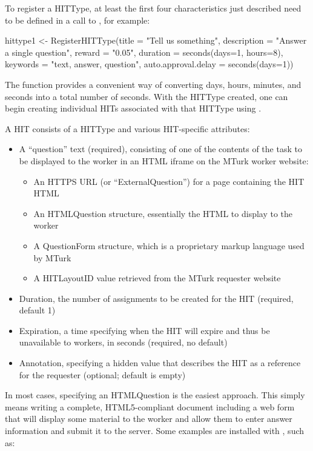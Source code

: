 To register a HITType, at least the first four characteristics just described need to be defined in a call to , for example:

\begin{example}
hittype1 <- RegisterHITType(title = "Tell us something", 
                            description = "Answer a single question", 
                            reward = "0.05", 
                            duration = seconds(days=1, hours=8), 
                            keywords = "text, answer, question", 
                            auto.approval.delay = seconds(days=1))
\end{example}

The  function provides a convenient way of converting days, hours, minutes, and seconds into a total number of seconds. With the HITType created, one can begin creating individual HITs associated with that HITType using .

A HIT consists of a HITType and various HIT-specific attributes:

\begin{itemize}
\item A ``question'' text (required), consisting of one of the contents of the task to be displayed to the worker in an HTML iframe on the MTurk worker website:
	\begin{itemize}
		\item An HTTPS URL (or ``ExternalQuestion'') for a page containing the HIT HTML
		\item An HTMLQuestion structure, essentially the HTML to display to the worker
		\item A QuestionForm structure, which is a proprietary markup language used by MTurk
		\item A HITLayoutID value retrieved from the MTurk requester website
	\end{itemize}
\item Duration, the number of assignments to be created for the HIT (required, default 1)
\item Expiration, a time specifying when the HIT will expire and thus be unavailable to workers, in seconds (required, no default)
\item Annotation, specifying a hidden value that describes the HIT as a reference for the requester (optional; default is empty)
\end{itemize}

In most cases, specifying an HTMLQuestion is the easiest approach. This simply means writing a complete, HTML5-compliant document including a web form that will display some material to the worker and allow them to enter answer information and submit it to the server. Some examples are installed with , such as:

